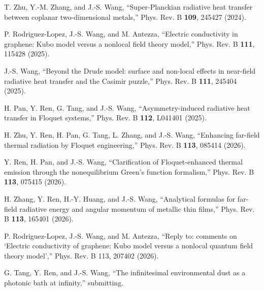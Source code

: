 \itm T. Zhu, Y.-M. Zhang, and J.-S. Wang, ``Super-Planckian radiative heat transfer between coplanar two-dimensional metals,'' 
Phys. Rev. B {\bf 109}, 245427 (2024). 

\itm P. Rodriguez-Lopez, J.-S. Wang, and M. Antezza, ``Electric conductivity in graphene: Kubo model versus a nonlocal field theory model,'' Phys. Rev. B {\bf 111}, 115428 (2025).

\itm J.-S. Wang, ``Beyond the Drude model: surface and non-local effects in near-field radiative heat transfer and the Casimir puzzle,'' Phys. Rev. B {\bf 111}, 245404 (2025).

\itm H. Pan, Y. Ren, G. Tang, and J.-S. Wang, ``Asymmetry-induced radiative heat transfer in Floquet systems,'' Phys. Rev. B {\bf 112}, L041401 (2025). 

\itm H. Zhu, Y. Ren, H. Pan, G. Tang, L. Zhang, and J.-S. Wang, ``Enhancing far-field thermal radiation by Floquet engineering,'' Phys. Rev. B {\bf 113}, 085414 (2026).

\itm Y. Ren, H. Pan, and J.-S. Wang, ``Clarification of Floquet-enhanced thermal emission through the nonequilibrium Green's function formalism,'' Phys. Rev. B {\bf 113}, 075415 (2026). 

\itm H. Zhang, Y. Ren, H.-Y. Huang, and J.-S. Wang, ``Analytical formulas for far-field radiative energy and angular momentum of metallic thin films,'' Phys. Rev. B {\bf 113}, 165401 (2026). 

\itm P. Rodriguez-Lopez, J.-S. Wang, and M. Antezza, ``Reply to: comments on `Electric conductivity of graphene: Kubo model versus a nonlocal quantum field theory model','' Phys. Rev. B {113}, 207402 (2026). 

\itm G. Tang, Y. Ren, and J.-S. Wang, ``The infinitesimal environmental dust as a photonic bath at infinity,'' submitting. 

\bye
